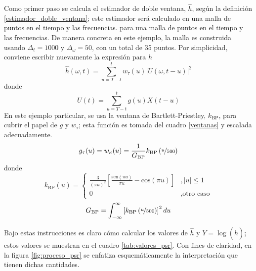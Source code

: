 \documentclass[12pt,letterpaper]{book}
\newcommand{\intR}{\int_{-\infty}^{\infty}}
\newcommand{\COS}[1]{\mathrm{cos}\left( #1 \right)}
\newcommand{\SEN}[1]{\mathrm{sen}\left( #1 \right)}
\newcommand{\abso}[1]{\left| #1 \right|}
\begin{document}
Como primer paso se calcula el estimador de doble ventana, $\widehat{h}$, según la definición \ref{estimador_doble_ventana}; este estimador será calculado en una malla de puntos en el tiempo y las frecuencias.
%
para una malla de puntos en el tiempo y las frecuencias.
%
De manera concreta en este ejemplo, la malla es construida usando $\Delta_t = 1000$ y $\Delta_\omega=50$, con un total de 35 puntos.
%
Por simplicidad, conviene escribir nuevamente la expresión para $\widehat{h}$
\begin{equation}
\widehat{h}(\omega, t) = \sum_{u=T-t}^t w_\tau (u) \abso{U(\omega,t-u)}^{2}
\end{equation}
donde
\begin{equation}
U(t) = \sum_{u=T-t}^t g(u) X(t-u)
\end{equation}
%
En este ejemplo particular, se usa la ventana de Bartlett-Priestley, $k_\text{BP}$, para cubrir el papel de $g$ y $w_\tau$; esta función es tomada del cuadro \ref{ventanas} y escalada adecuadamente.
\begin{equation}
g_\tau(u) = w_\kappa(u) = \frac{1}{G_{\text{BP}}} k_{\text{BP}}\left( \nicefrac{u}{500} \right)
\end{equation}
donde
\begin{equation}
k_{\text{BP}} (u) = \begin{cases}
\frac{3}{\left( \pi u \right)^2} 
\left[ 
\frac{\SEN{\pi u}}{\pi u} - \COS{\pi u} \right] &, \abso{u} 
\leq 1 \\
0 &, \text{otro caso}
\end{cases}
\end{equation}
\begin{equation}
G_{\text{BP}} = \intR \left[ k_{\text{BP}}\left( \nicefrac{u}{500} \right) \right]^2 du
\end{equation}

Bajo estas instrucciones es claro cómo calcular los valores de $\widehat{h}$ y $Y = \log\left( \widehat{h} \right)$; estos valores se muestran en el cuadro \ref{tab:valores_psr}.
%
Con fines de claridad, en la figura \ref{fig:proceso_psr} se enfatiza esquemáticamente la interpretación que tienen dichas cantidades.
\end{document}
